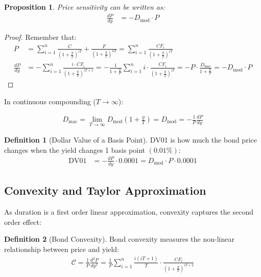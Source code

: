 \documentclass{article}
\theoremstyle{definition}  %
\newtheorem{definition}{Definition}[section]
\theoremstyle{plain}  %
\newtheorem{proposition}{Proposition}[section]
\numberwithin{definition}{section}
\numberwithin{proposition}{section}
\numberwithin{theorem}{section}
\numberwithin{equation}{section}
\begin{document}
\begin{proposition}
    Price sensitivity can be written as:
    \begin{align*}
        \frac{dP}{dy} &= -D_{\text{mod}} \cdot P
    \end{align*}
\end{proposition}

\begin{proof}
    Remember that:
    \begin{align*}
        P &= \sum_{i = 1}^{n} \frac{C}{(1 + \frac{y}{T})^{iT}} + \frac{F}{(1 + \frac{y}{T})^{nT}} = \sum_{i = 1}^{n} \frac{CF_i}{(1 + \frac{y}{T})^{iT}} \\
        \frac{dP}{dy} &= - \sum_{i = 1}^{n} \frac{i \cdot CF_{i}}{(1 + \frac{y}{T})^{iT + 1}} = - \frac{1}{1 + \frac{y}{T}} \sum_{i = 1}^{n} i \cdot \frac{CF_i}{(1 + \frac{y}{T})^{iT}} = -P \cdot \frac{D_{\text{mac}}}{1 + \frac{y}{T}} = - D_{\text{mod}} \cdot P
    \end{align*}
\end{proof}

In continuous compounding ($T \to \infty$):

\begin{align*}
    D_{\text{mac}} = \lim_{T \to \infty} D_{\text{mod}} \left(1 + \frac{y}{T}\right) = D_{\text{mod}} = - \frac{1}{P} \frac{dP}{dy}
\end{align*}

\begin{definition}[Dollar Value of a Basis Point]
    DV01 is how much the bond price changes when the yield changes 1 basis point $(0.01 \%)$:
    \begin{align*}
        \text{DV01} &= - \frac{dP}{dy} \cdot 0.0001 = D_{\text{mod}} \cdot P \cdot 0.0001
    \end{align*}
\end{definition}

\subsection{Convexity and Taylor Approximation}
As duration is a first order linear approximation, convexity captures the second order effect:

\begin{definition}[Bond Convexity]
    Bond convexity measures the non-linear relationship between price and yield:
    \begin{align*}
        \mathcal{C} = \frac{1}{P} \frac{d^{2} P}{dy^{2}} = \frac{1}{P} \sum_{i = 1}^{n} \frac{i (iT + 1)}{T} \cdot \frac{CF_i}{(1 + \frac{y}{T})^{iT + 2}}
    \end{align*}
\end{definition}
\end{document}
